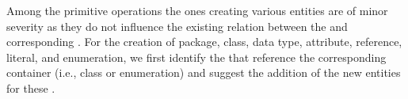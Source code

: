 
Among the primitive operations the ones creating various entities are of minor severity as they do not influence the existing relation between the \metamodel and corresponding \viewtypes. For the creation of package, class, data type, attribute, reference, literal, and enumeration, we first identify the \viewtypes that reference the corresponding container (i.e., class or enumeration) and suggest the addition of the new entities for these \viewtypes.

